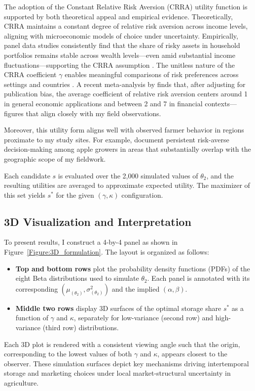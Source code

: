 The adoption of the Constant Relative Risk Aversion (CRRA) utility function is supported by both theoretical appeal and empirical evidence. Theoretically, CRRA maintains a constant degree of relative risk aversion across income levels, aligning with microeconomic models of choice under uncertainty. Empirically, panel data studies consistently find that the share of risky assets in household portfolios remains stable across wealth levels—even amid substantial income fluctuations—supporting the CRRA assumption \citep{Berger2020Characterizing, chiappori2011relative, zavala2024unfair}. The unitless nature of the CRRA coefficient $\gamma$ enables meaningful comparisons of risk preferences across settings and countries \citep{Szpiro1986Relative, hardaker2000some}. A recent meta-analysis by \citet{Irsova2025Relative} finds that, after adjusting for publication bias, the average coefficient of relative risk aversion centers around 1 in general economic applications and between 2 and 7 in financial contexts—figures that align closely with my field observations.




Moreover, this utility form aligns well with observed farmer behavior in regions proximate to my study sites. For example, \citet{jin2024losses} document persistent risk-averse decision-making among apple growers in areas that substantially overlap with the geographic scope of my fieldwork.

Each candidate $s$ is evaluated over the 2,000 simulated values of $\theta_2$, and the resulting utilities are averaged to approximate expected utility. The maximizer of this set yields $s^*$ for the given $(\gamma, \kappa)$ configuration.


\subsection{3D Visualization and Interpretation}
\noindent To present results, I construct a 4-by-4 panel as shown in Figure~\ref{Figure:3D_formulation}. The layout is organized as follows:
\begin{itemize}
\item \textbf{Top and bottom rows} plot the probability density functions (PDFs) of the eight Beta distributions used to simulate $\theta_2$. Each panel is annotated with its corresponding $(\mu_{(\theta_2)}, \sigma^2_{(\theta_2)})$ and the implied $(\alpha, \beta)$.
\item \textbf{Middle two rows} display 3D surfaces of the optimal storage share $s^*$ as a function of $\gamma$ and $\kappa$, separately for low-variance (second row) and high-variance (third row) distributions.
\end{itemize}
Each 3D plot is rendered with a consistent viewing angle such that the origin, corresponding to the lowest values of both $\gamma$ and $\kappa$, appears closest to the observer. These simulation surfaces depict key mechanisms driving intertemporal storage and marketing choices under local market-structural uncertainty in agriculture.

